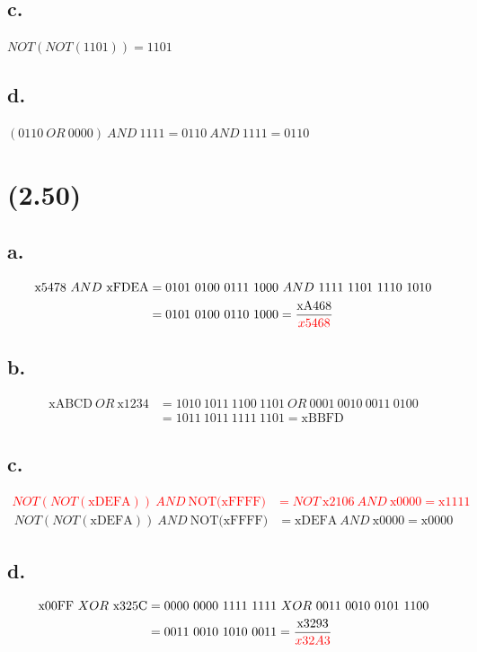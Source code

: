 \documentclass[11pt,a4paper]{article}
\begin{document}
	\subsection*{c.}
	$NOT(NOT(1101))=1101$
	\subsection*{d.}
	$(0110\ OR\ 0000)\ AND\ 1111=0110\ AND\ 1111=0110$
	
	
	\section{(2.50)}
	\subsection*{a.}
	\begin{align*}
	\textrm{x5478}\ AND\ \textrm{xFDEA}&=0101\ 0100\ 0111\ 1000\ AND\ 1111\ 1101\ 1110\ 1010\\
	&=0101\ 0100\ 0110\ 1000=\frac{\textrm{xA468}}{\textcolor{red}{x5468}}
	\end{align*}
	\subsection*{b.}
	\begin{align*}
	\textrm{xABCD}\ OR\ \textrm{x1234}&=1010\ 1011\ 1100\ 1101\ OR\ 0001\ 0010\ 0011\ 0100\\
	&=1011\ 1011\ 1111\ 1101=\textrm{xBBFD}
	\end{align*}
	\subsection*{c.}
	\textcolor{red}{
		\begin{align*}
		NOT(NOT(\textrm{xDEFA}))\ AND\ \textrm{NOT(xFFFF)}&=NOT\ \textrm{x2106}\ AND\ \textrm{x0000} = \textrm{x1111}
		\end{align*}
	}
	\begin{align*}
	NOT(NOT(\textrm{xDEFA}))\ AND\ \textrm{NOT(xFFFF)}&=\textrm{xDEFA}\ AND\ \textrm{x0000} = \textrm{x0000}
	\end{align*}
	\subsection*{d.}
	\begin{align*}
	\textrm{x00FF}\ XOR\ \textrm{x325C}&=0000\ 0000\ 1111\ 1111\ XOR\ 0011\ 0010\ 0101\ 1100\\
	&=0011\ 0010\ 1010\ 0011=\frac{\textrm{x3293}}{\textcolor{red}{x32A3}}
	\end{align*}
	
\end{document}
